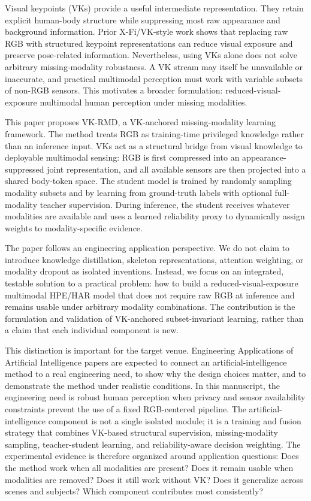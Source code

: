 \documentclass[preprint,12pt]{elsarticle}
\newcommand{\method}{VK-RMD}
\begin{document}
Visual keypoints (VKs) provide a useful intermediate representation. They retain explicit human-body structure while suppressing most raw appearance and background information. Prior X-Fi/VK-style work shows that replacing raw RGB with structured keypoint representations can reduce visual exposure and preserve pose-related information. Nevertheless, using VKs alone does not solve arbitrary missing-modality robustness. A VK stream may itself be unavailable or inaccurate, and practical multimodal perception must work with variable subsets of non-RGB sensors. This motivates a broader formulation: reduced-visual-exposure multimodal human perception under missing modalities.

This paper proposes \method, a VK-anchored missing-modality learning framework. The method treats RGB as training-time privileged knowledge rather than an inference input. VKs act as a structural bridge from visual knowledge to deployable multimodal sensing: RGB is first compressed into an appearance-suppressed joint representation, and all available sensors are then projected into a shared body-token space. The student model is trained by randomly sampling modality subsets and by learning from ground-truth labels with optional full-modality teacher supervision. During inference, the student receives whatever modalities are available and uses a learned reliability proxy to dynamically assign weights to modality-specific evidence.

The paper follows an engineering application perspective. We do not claim to introduce knowledge distillation, skeleton representations, attention weighting, or modality dropout as isolated inventions. Instead, we focus on an integrated, testable solution to a practical problem: how to build a reduced-visual-exposure multimodal HPE/HAR model that does not require raw RGB at inference and remains usable under arbitrary modality combinations. The contribution is the formulation and validation of VK-anchored subset-invariant learning, rather than a claim that each individual component is new.

This distinction is important for the target venue. Engineering Applications of Artificial Intelligence papers are expected to connect an artificial-intelligence method to a real engineering need, to show why the design choices matter, and to demonstrate the method under realistic conditions. In this manuscript, the engineering need is robust human perception when privacy and sensor availability constraints prevent the use of a fixed RGB-centered pipeline. The artificial-intelligence component is not a single isolated module; it is a training and fusion strategy that combines VK-based structural supervision, missing-modality sampling, teacher-student learning, and reliability-aware decision weighting. The experimental evidence is therefore organized around application questions: Does the method work when all modalities are present? Does it remain usable when modalities are removed? Does it still work without VK? Does it generalize across scenes and subjects? Which component contributes most consistently?
\end{document}
